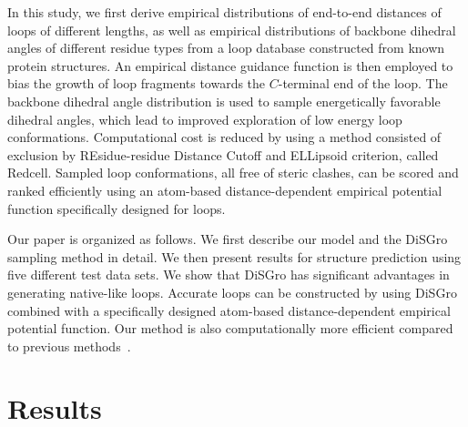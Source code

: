 In this study, we first derive empirical distributions of end-to-end
distances of loops of different lengths, as well as empirical
distributions of backbone dihedral angles of different residue types
from a loop database constructed from known protein structures. An
empirical distance guidance function is then employed to bias the
growth of loop fragments towards the $C$-terminal end of the loop.
The backbone dihedral angle distribution is used to sample
energetically favorable dihedral angles, which lead to improved
exploration of low energy loop conformations. Computational cost is
reduced by using a method consisted of exclusion by REsidue-residue
Distance Cutoff and ELLipsoid criterion, called {\sc Redcell}.
Sampled loop conformations, all free of steric clashes, can be
scored and ranked efficiently using an atom-based distance-dependent
empirical potential function specifically designed for loops.

Our paper is organized as follows. We first describe our model and
the {\sc DiSGro} sampling method in detail. We then present results
for structure prediction using five different test data sets. We
show that {\sc DiSGro} has significant advantages in generating
native-like loops. Accurate loops can be constructed by using {\sc
DiSGro} combined with a specifically designed atom-based
distance-dependent empirical potential function. Our method is also
computationally more efficient compared to previous
methods~\cite{de2003,canutescu2003,soto2008,liu2009,lee2010}.

\section*{Results}

